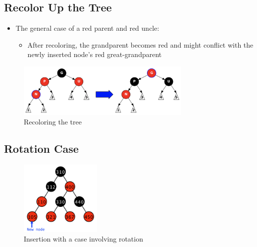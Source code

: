 \documentclass[
  10pt,
  english,
  letterpaper,
,tablecaptionabove
]{scrartcl}
\providecommand{\tightlist}{%
  \setlength{\itemsep}{0pt}\setlength{\parskip}{0pt}}
\begin{document}
\hypertarget{recolor-up-the-tree}{%
\subsection{Recolor Up the Tree}\label{recolor-up-the-tree}}

\begin{itemize}
\tightlist
\item
  The general case of a red parent and red uncle:

  \begin{itemize}
  \tightlist
  \item
    After recoloring, the grandparent becomes red and might conflict
    with the newly inserted node's red great-grandparent
  \end{itemize}
\end{itemize}

\begin{figure}
\centering
\includegraphics[width=0.75\textwidth,height=\textheight]{images/4.png}
\caption{Recoloring the tree}
\end{figure}

\hypertarget{rotation-case}{%
\subsection{Rotation Case}\label{rotation-case}}

\begin{figure}
\centering
\includegraphics[width=0.35\textwidth,height=\textheight]{images/5.png}
\caption{Insertion with a case involving rotation}
\end{figure}
\end{document}
